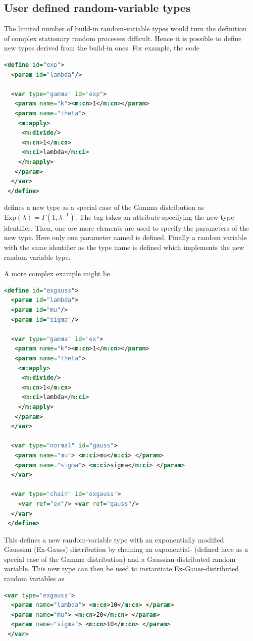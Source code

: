 \documentclass[a4paper, 10pt]{paper}
\begin{document}
\subsection{User defined random-variable types}
The limited number of build-in random-variable types would turn the definition of complex stationary random
processes difficult. Hence it is possible to define new types derived from the build-in ones. For example,
the code 
\begin{lstlisting}[language=XML]
 <define id="exp">
  <param id="lambda"/>

  <var type="gamma" id="exp">
   <param name="k"><m:cn>1</m:cn></param>
   <param name="theta">
    <m:apply>
     <m:divide/>
     <m:cn>1</m:cn>
     <m:ci>lambda</m:ci>
    </m:apply>
   </param>
  </var>
 </define>
\end{lstlisting}
defines a new type  as a special case of the Gamma distribution as
$\text{Exp}(\lambda) = \Gamma(1,\lambda^{-1})$. The  tag takes an  
attribute specifying the new type identifier. Then, one ore more  elements are
used to specify the parameters of the new type. 
Here only one parameter named  is defined. Finally a random variable with the same
identifier as the type name is defined which implements the new random variable type.

A more complex example might be
\begin{lstlisting}[language=XML]
 <define id="exgauss">
  <param id="lambda">
  <param id="mu"/>
  <param id="sigma"/>

  <var type="gamma" id="ex">
   <param name="k"><m:cn>1</m:cn></param>
   <param name="theta">
    <m:apply>
     <m:divide/>
     <m:cn>1</m:cn>
     <m:ci>lambda</m:ci>
    </m:apply>
   </param>
  </var>

  <var type="normal" id="gauss">
   <param name="mu"> <m:ci>mu</m:ci> </param>
   <param name="sigma"> <m:ci>sigma</m:ci> </param>
  </var>

  <var type="chain" id="exgauss">
    <var ref="ex"/> <var ref="gauss"/>
  </var>
 </define>
\end{lstlisting}

This defines a new random-variable type with an exponentially modified Gaussian (Ex-Gauss) 
distribution by chaining an exponential- (defined here as a special case of the Gamma 
distribution) and a Gaussian-distributed random variable. This new type can then be used
to instantiate Ex-Gauss-distributed random variables as
\begin{lstlisting}[language=XML]
 <var type="exgauss">
  <param name="lambda"> <m:cn>10</m:cn> </param>
  <param name="mu"> <m:cn>20</m:cn> </param>
  <param name="sigma"> <m:cn>10</m:cn> </param>
 </var>
\end{lstlisting}
\end{document}
